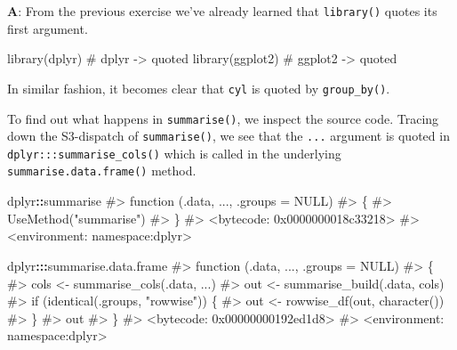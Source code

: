 \documentclass[
]{krantz}
\makeatletter
\newenvironment{Shaded}{\begin{snugshade}}{\end{snugshade}}
\newcommand{\CommentTok}[1]{\textcolor[rgb]{0.56,0.35,0.01}{\textit{#1}}}
\newcommand{\DataTypeTok}[1]{\textcolor[rgb]{0.13,0.29,0.53}{#1}}
\newcommand{\KeywordTok}[1]{\textcolor[rgb]{0.13,0.29,0.53}{\textbf{#1}}}
\newcommand{\NormalTok}[1]{#1}
\newcommand{\OperatorTok}[1]{\textcolor[rgb]{0.81,0.36,0.00}{\textbf{#1}}}
\newcommand{\StringTok}[1]{\textcolor[rgb]{0.31,0.60,0.02}{#1}}
\newenvironment{kframe}{%
\medskip{}
\setlength{\fboxsep}{.8em}
 \def\at@end@of@kframe{}%
 \ifinner\ifhmode%
  \def\at@end@of@kframe{\end{minipage}}%
  \begin{minipage}{\columnwidth}%
 \fi\fi%
 \def\FrameCommand##1{\hskip\@totalleftmargin \hskip-\fboxsep
 \colorbox{shadecolor}{##1}\hskip-\fboxsep
     \hskip-\linewidth \hskip-\@totalleftmargin \hskip\columnwidth}%
 \MakeFramed {\advance\hsize-\width
   \@totalleftmargin\z@ \linewidth\hsize
   \@setminipage}}%
 {\par\unskip\endMakeFramed%
 \at@end@of@kframe}
\renewenvironment{Shaded}{\begin{kframe}}{\end{kframe}}
\renewcommand{\KeywordTok} [1]{\textcolor[rgb]{0.00,0.44,0.13}{{#1}}}
\renewcommand{\DataTypeTok}[1]{\textcolor[rgb]{0.56,0.13,0.00}{{#1}}}
\renewcommand{\StringTok}  [1]{\textcolor[rgb]{0.25,0.44,0.63}{{#1}}}
\renewcommand{\CommentTok} [1]{\textcolor[rgb]{0.38,0.63,0.69}{{#1}}}
\renewcommand{\NormalTok}  [1]{{#1}}
\makeatother
\begin{document}
\textbf{{A}}: From the previous exercise we've already learned that \texttt{library()} quotes its first argument.

\begin{Shaded}
\begin{Highlighting}[]
\KeywordTok{library}\NormalTok{(dplyr)    }\CommentTok{# dplyr   -> quoted}
\KeywordTok{library}\NormalTok{(ggplot2)  }\CommentTok{# ggplot2 -> quoted}
\end{Highlighting}
\end{Shaded}

In similar fashion, it becomes clear that \texttt{cyl} is quoted by \texttt{group\_by()}.

\begin{Shaded}
\end{Shaded}

To find out what happens in \texttt{summarise()}, we inspect the source code. Tracing down the S3-dispatch of \texttt{summarise()}, we see that the \texttt{...} argument is quoted in \texttt{dplyr:::summarise\_cols()} which is called in the underlying \texttt{summarise.data.frame()} method.

\begin{Shaded}
\begin{Highlighting}[]
\NormalTok{dplyr}\OperatorTok{::}\NormalTok{summarise}
\CommentTok{#> function (.data, ..., .groups = NULL) }
\CommentTok{#> \{}
\CommentTok{#>     UseMethod("summarise")}
\CommentTok{#> \}}
\CommentTok{#> <bytecode: 0x0000000018c33218>}
\CommentTok{#> <environment: namespace:dplyr>}
\end{Highlighting}
\end{Shaded}

\begin{Shaded}
\begin{Highlighting}[]
\NormalTok{dplyr}\OperatorTok{:::}\NormalTok{summarise.data.frame}
\CommentTok{#> function (.data, ..., .groups = NULL) }
\CommentTok{#> \{}
\CommentTok{#>     cols <- summarise_cols(.data, ...)}
\CommentTok{#>     out <- summarise_build(.data, cols)}
\CommentTok{#>     if (identical(.groups, "rowwise")) \{}
\CommentTok{#>         out <- rowwise_df(out, character())}
\CommentTok{#>     \}}
\CommentTok{#>     out}
\CommentTok{#> \}}
\CommentTok{#> <bytecode: 0x00000000192ed1d8>}
\CommentTok{#> <environment: namespace:dplyr>}
\end{Highlighting}
\end{Shaded}
\end{document}
